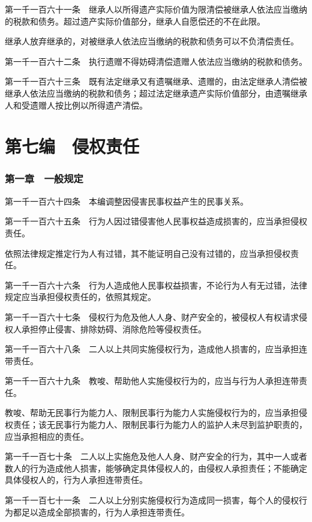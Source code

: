 \documentclass[UTF8,12pt,a4paper]{ctexbook}
\begin{document}
第一千一百六十一条　继承人以所得遗产实际价值为限清偿被继承人依法应当缴纳的税款和债务。超过遗产实际价值部分，继承人自愿偿还的不在此限。

继承人放弃继承的，对被继承人依法应当缴纳的税款和债务可以不负清偿责任。

第一千一百六十二条　执行遗赠不得妨碍清偿遗赠人依法应当缴纳的税款和债务。

第一千一百六十三条　既有法定继承又有遗嘱继承、遗赠的，由法定继承人清偿被继承人依法应当缴纳的税款和债务；超过法定继承遗产实际价值部分，由遗嘱继承人和受遗赠人按比例以所得遗产清偿。

\cleardoublepage
{}
\part*{第七编　侵权责任}

\section*{第一章　一般规定}

第一千一百六十四条　本编调整因侵害民事权益产生的民事关系。

第一千一百六十五条　行为人因过错侵害他人民事权益造成损害的，应当承担侵权责任。

依照法律规定推定行为人有过错，其不能证明自己没有过错的，应当承担侵权责任。

第一千一百六十六条　行为人造成他人民事权益损害，不论行为人有无过错，法律规定应当承担侵权责任的，依照其规定。

第一千一百六十七条　侵权行为危及他人人身、财产安全的，被侵权人有权请求侵权人承担停止侵害、排除妨碍、消除危险等侵权责任。

第一千一百六十八条　二人以上共同实施侵权行为，造成他人损害的，应当承担连带责任。

第一千一百六十九条　教唆、帮助他人实施侵权行为的，应当与行为人承担连带责任。

教唆、帮助无民事行为能力人、限制民事行为能力人实施侵权行为的，应当承担侵权责任；该无民事行为能力人、限制民事行为能力人的监护人未尽到监护职责的，应当承担相应的责任。

第一千一百七十条　二人以上实施危及他人人身、财产安全的行为，其中一人或者数人的行为造成他人损害，能够确定具体侵权人的，由侵权人承担责任；不能确定具体侵权人的，行为人承担连带责任。

第一千一百七十一条　二人以上分别实施侵权行为造成同一损害，每个人的侵权行为都足以造成全部损害的，行为人承担连带责任。
\end{document}
